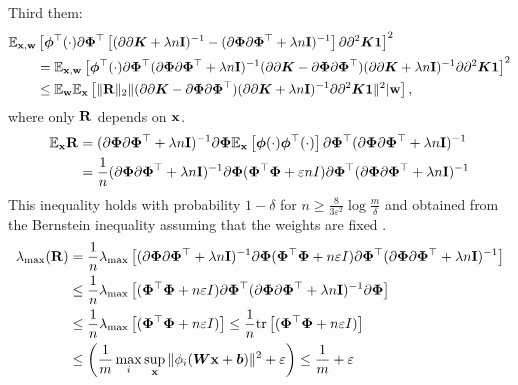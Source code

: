 Third them:
\begin{align*}
    \mathbb{E}_{{\bf x, w}}&\left[{\bm \phi}^{\top}(\cdot)\partial\bm{\Phi}^{\top}\left[(\partial\partial {\bm K} + \lambda n{\bf I})^{-1} - (\partial\bm{\Phi}\partial\bm{\Phi}^{\top} + \lambda n {\bf I})^{-1}\right]\partial\partial^2 {\bm K}{\bf 1}\right]^2 \\
    &= \mathbb{E}_{{\bf x, w}}\left[{\bm \phi}^{\top}(\cdot)\partial\bm{\Phi}^{\top}(\partial\bm{\Phi}\partial\bm{\Phi}^{\top} + \lambda n{\bf I})^{-1}(\partial\partial {\bm K} - \partial\bm{\Phi}\partial\bm{\Phi}^{\top})(\partial\partial {\bm K} + \lambda n {\bf I})^{-1}\partial\partial^2 {\bm K}{\bf 1}\right]^2\\
    &\leq \mathbb{E}_{{\bf w}}\mathbb{E}_{{\bf x}}\left[\|{\bf R}\|_2 \|(\partial\partial {\bm K} - \partial\bm{\Phi}\partial\bm{\Phi}^{\top})(\partial\partial {\bm K} + \lambda n {\bf I})^{-1}\partial\partial^2 {\bm K}{\bf 1}\|^2 | {\bf w}\right],
\end{align*}
where only $\bf R$ depends on ${\bf x}$.
\begin{align*}
    \mathbb{E}_{\bf x}{\bf R}
    &= (\partial\bm{\Phi}\partial\bm{\Phi}^{\top} + \lambda n{\bf I})^{-1}\partial\bm{\Phi}
    \mathbb{E}_{\bf x}\left[{\bm \phi}(\cdot){\bm \phi}^{\top}(\cdot)\right]\partial\bm{\Phi}^{\top}(\partial\bm{\Phi}\partial\bm{\Phi}^{\top} + \lambda n{\bf I})^{-1}\\
    &= \frac{1}{n} (\partial\bm{\Phi}\partial\bm{\Phi}^{\top} + \lambda n{\bf I})^{-1}\partial\bm{\Phi}
    (\bm{\Phi}^{\top}\bm{\Phi} + \varepsilon n I)\partial\bm{\Phi}^{\top}(\partial\bm{\Phi}\partial\bm{\Phi}^{\top} + \lambda n{\bf I})^{-1}
\end{align*}
This inequality holds with probability $1 - \delta$ for
$n \geq \frac{8}{3\varepsilon^2} \log\frac{m}{\delta}$
and obtained from the Bernstein inequality assuming that the weights are fixed \cite{Tropp_2015}.
\begin{align*}
    \lambda_{\max}({\bf R})
    &= \frac{1}{n}\lambda_{\max}\left[(\partial\bm{\Phi}\partial\bm{\Phi}^{\top} +
    \lambda n{\bf I})^{-1}\partial\bm{\Phi}
    (\bm{\Phi}^{\top}\bm{\Phi} + n\varepsilon I)\partial\bm{\Phi}^{\top}(\partial\bm{\Phi}
    \partial\bm{\Phi}^{\top} + \lambda n{\bf I})^{-1}\right]\\
    &\leq \frac{1}{n}\lambda_{\max}\left[(\bm{\Phi}^{\top}\bm{\Phi} + n\varepsilon I)
    \partial\bm{\Phi}^{\top}(\partial\bm{\Phi}\partial\bm{\Phi}^{\top} + \lambda n{\bf I})^{-1}\partial\bm{\Phi}
    \right]\\
    &\leq \frac{1}{n}\lambda_{\max}\left[(\bm{\Phi}^{\top}\bm{\Phi} + n\varepsilon I)\right] \leq
    \frac{1}{n}{\rm tr}\left[(\bm{\Phi}^{\top}\bm{\Phi} + n\varepsilon I)\right] \\
    &\leq \left(\frac{1}{m}\max_i\sup_{\bf x}\|\phi_i({\bm W}{\bf x} + {\bm b})\|^2 +
    \varepsilon\right) \leq \frac{1}{m} + \varepsilon
\end{align*}

